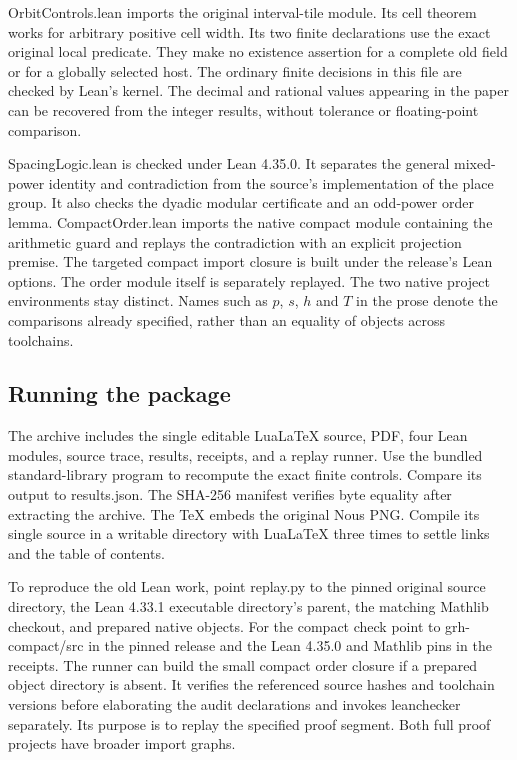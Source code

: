 \documentclass[12pt,letterpaper]{article}
\DeclareRobustCommand{\id}[1]{\mbox{\small\ttfamily #1}}
\begin{document}
\id{OrbitControls.lean} imports the original interval-tile module. Its cell theorem works for arbitrary positive cell width. Its two finite declarations use the exact original local predicate. They make no existence assertion for a complete old field or for a globally selected host. The ordinary finite decisions in this file are checked by Lean's kernel. The decimal and rational values appearing in the paper can be recovered from the integer results, without tolerance or floating-point comparison.

\id{SpacingLogic.lean} is checked under Lean 4.35.0. It separates the general mixed-power identity and contradiction from the source's implementation of the place group. It also checks the dyadic modular certificate and an odd-power order lemma. \id{CompactOrder.lean} imports the native compact module containing the arithmetic guard and replays the contradiction with an explicit projection premise. The targeted compact import closure is built under the release's Lean options. The order module itself is separately replayed. The two native project environments stay distinct. Names such as $p$, $s$, $h$ and $T$ in the prose denote the comparisons already specified, rather than an equality of objects across toolchains.

\subsection{Running the package}

The archive includes the single editable LuaLaTeX source, PDF, four Lean modules, source trace, results, receipts, and a replay runner. Use the bundled standard-library program to recompute the exact finite controls. Compare its output to \id{results.json}. The SHA-256 manifest verifies byte equality after extracting the archive. The TeX embeds the original Nous PNG. Compile its single source in a writable directory with LuaLaTeX three times to settle links and the table of contents.

To reproduce the old Lean work, point \id{replay.py} to the pinned original source directory, the Lean 4.33.1 executable directory's parent, the matching Mathlib checkout, and prepared native objects. For the compact check point to \id{grh-compact/src} in the pinned release and the Lean 4.35.0 and Mathlib pins in the receipts. The runner can build the small compact order closure if a prepared object directory is absent. It verifies the referenced source hashes and toolchain versions before elaborating the audit declarations and invokes \id{leanchecker} separately. Its purpose is to replay the specified proof segment. Both full proof projects have broader import graphs.
\end{document}
